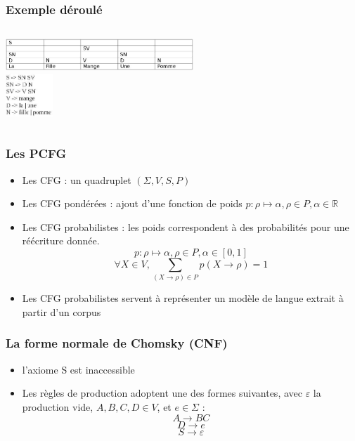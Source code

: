 \documentclass[table]{beamer}
\begin{document}
\begin{frame}
\frametitle{Exemple déroulé}
  \begin{columns}
  \begin{column}{0.6\textwidth}
     \includegraphics[width=200pt,]{10.jpeg}  \\
  \includegraphics[width=50pt,]{11.jpeg}  
  \end{column}
  \end{columns}
\end{frame}


\begin{frame}
 \frametitle{Les PCFG}
 \begin{itemize}
  \item<1-4>{Les CFG : un quadruplet $(\Sigma,V,S,P)$ }
  \item<2-4>{Les CFG pondérées : ajout d'une fonction de poids $ p : \rho \mapsto \alpha, \rho \in P, \alpha \in \mathbb{R} $ }
  \item<3-4>{Les CFG probabilistes : les poids correspondent à des probabilités pour une réécriture donnée.  
  $$ p : \rho \mapsto \alpha, \rho \in P, \alpha \in [0,1]$$ $$ \forall X \in V, \sum_{(X\to \rho ) \in P } p(X \to \rho)=1 $$ }
  \item<4>{Les CFG probabilistes servent à représenter un modèle de langue extrait à partir d'un corpus }
 \end{itemize}

\end{frame}



\begin{frame} 
\frametitle{La forme normale de Chomsky (CNF)}
 \begin{itemize}
 \item {l'axiome S est inaccessible}
 \item {Les règles de production adoptent une des formes suivantes, avec  $\varepsilon$ la production vide, $A,B,C,D \in V$, et $e \in \Sigma$ : 
     $$A \rightarrow B C $$ 
     $$ D \rightarrow e $$
     $$ S \rightarrow \varepsilon$$ }

 \end{itemize}

\end{frame}
\end{document}

